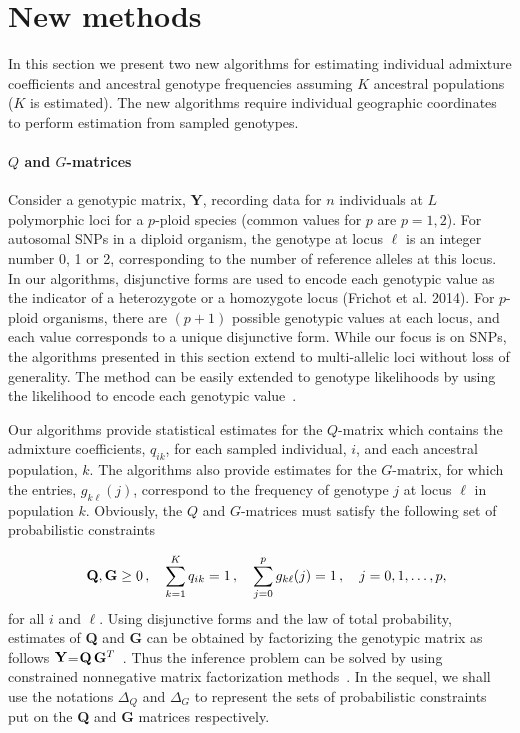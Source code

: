 \clearpage
\newpage

\section{New methods}


In this section we present two new algorithms for estimating individual admixture coefficients and ancestral genotype frequencies assuming $K$ ancestral populations ($K$ is estimated). The new algorithms require individual geographic coordinates to perform estimation from sampled genotypes.

\paragraph{$Q$ and $G$-matrices} Consider a genotypic matrix, {\bf Y}, recording data for $n$ individuals at $L$ polymorphic loci for a $p$-ploid species (common values for $p$ are $p = 1,2$). For autosomal SNPs in a diploid organism, the genotype at locus $\ell$  is an integer number 0, 1 or 2, corresponding to the number of reference alleles at this locus. In our algorithms, disjunctive forms are used  to encode each genotypic value as the indicator of a heterozygote or a homozygote locus (Frichot et al. 2014). For $p$-ploid organisms, there are $(p+1)$ possible genotypic values at each locus, and each value corresponds to a unique disjunctive form. While our focus is on SNPs, the algorithms presented in this section extend to multi-allelic loci without loss of generality. 
The method can be easily extended to genotype likelihoods by using the likelihood to encode each genotypic value~\citep{Korneliussen2014}.

Our algorithms provide statistical estimates for the $Q$-matrix which contains the admixture coefficients, $q_{ik}$, for each sampled individual, $i$, and each ancestral population, $k$. The algorithms also provide estimates for the $G$-matrix, for which the entries, $g_{k\ell}(j)$, correspond to the frequency of genotype $j$ at locus $\ell$ in population $k$. Obviously, the $Q$ and $G$-matrices must satisfy the following set of probabilistic constraints 

$$
\quad {\bf Q},{\bf G} \geq 0 \, , \quad  \sum_{k=1}^K q_{ik} = 1 \, , \quad \sum_{j=0}^p g_{k\ell}(j) = 1 \, , \quad j = 0,1,\dots, p,
$$
for all $i$ and $\ell$. Using disjunctive forms and the law of total probability, estimates of {\bf Q} and {\bf G} can be obtained by factorizing the genotypic matrix as follows ${\bf Y}$=${\bf Q}\,{\bf G}^T$~\citep{Frichot2014}. Thus the inference problem can be solved by using constrained nonnegative matrix factorization methods~\citep{Lee1999, Cichocki2009}. In the sequel, we shall use the notations  $\Delta_Q$ and $\Delta_G$ to represent the sets of probabilistic constraints put on the {\bf Q} and {\bf G} matrices respectively. 

